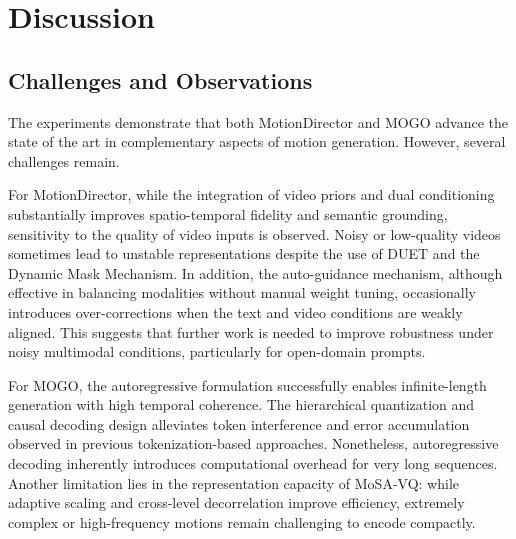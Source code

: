 \documentclass[a4paper,12pt]{article}
\begin{document}


\section{Discussion}

\subsection{Challenges and Observations}
The experiments demonstrate that both MotionDirector and MOGO advance the state of the art in complementary aspects of motion generation. However, several challenges remain. 

For MotionDirector, while the integration of video priors and dual conditioning substantially improves spatio-temporal fidelity and semantic grounding, sensitivity to the quality of video inputs is observed. Noisy or low-quality videos sometimes lead to unstable representations despite the use of DUET and the Dynamic Mask Mechanism. In addition, the auto-guidance mechanism, although effective in balancing modalities without manual weight tuning, occasionally introduces over-corrections when the text and video conditions are weakly aligned. This suggests that further work is needed to improve robustness under noisy multimodal conditions, particularly for open-domain prompts.

For MOGO, the autoregressive formulation successfully enables infinite-length generation with high temporal coherence. The hierarchical quantization and causal decoding design alleviates token interference and error accumulation observed in previous tokenization-based approaches. Nonetheless, autoregressive decoding inherently introduces computational overhead for very long sequences. Another limitation lies in the representation capacity of MoSA-VQ: while adaptive scaling and cross-level decorrelation improve efficiency, extremely complex or high-frequency motions remain challenging to encode compactly.
\end{document}
